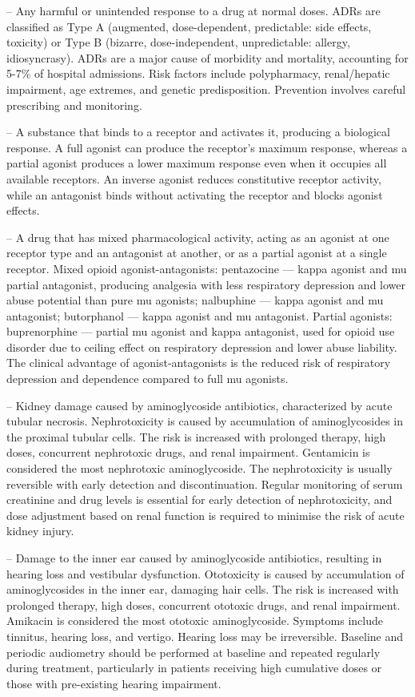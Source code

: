 -- Any harmful or unintended response to a drug at normal doses. ADRs are classified as Type A (augmented, dose-dependent, predictable: side effects, toxicity) or Type B (bizarre, dose-independent, unpredictable: allergy, idiosyncrasy). ADRs are a major cause of morbidity and mortality, accounting for 5-7\% of hospital admissions. Risk factors include polypharmacy, renal/hepatic impairment, age extremes, and genetic predisposition. Prevention involves careful prescribing and monitoring.

-- A substance that binds to a receptor and activates it, producing a biological response. A full agonist can produce the receptor's maximum response, whereas a partial agonist produces a lower maximum response even when it occupies all available receptors. An inverse agonist reduces constitutive receptor activity, while an antagonist binds without activating the receptor and blocks agonist effects.

-- A drug that has mixed pharmacological activity, acting as an agonist at one receptor type and an antagonist at another, or as a partial agonist at a single receptor. Mixed opioid agonist-antagonists: pentazocine — kappa agonist and mu partial antagonist, producing analgesia with less respiratory depression and lower abuse potential than pure mu agonists; nalbuphine — kappa agonist and mu antagonist; butorphanol — kappa agonist and mu antagonist. Partial agonists: buprenorphine — partial mu agonist and kappa antagonist, used for opioid use disorder due to ceiling effect on respiratory depression and lower abuse liability. The clinical advantage of agonist-antagonists is the reduced risk of respiratory depression and dependence compared to full mu agonists.

-- Kidney damage caused by aminoglycoside antibiotics, characterized by acute tubular necrosis. Nephrotoxicity is caused by accumulation of aminoglycosides in the proximal tubular cells. The risk is increased with prolonged therapy, high doses, concurrent nephrotoxic drugs, and renal impairment. Gentamicin is considered the most nephrotoxic aminoglycoside. The nephrotoxicity is usually reversible with early detection and discontinuation. Regular monitoring of serum creatinine and drug levels is essential for early detection of nephrotoxicity, and dose adjustment based on renal function is required to minimise the risk of acute kidney injury.

-- Damage to the inner ear caused by aminoglycoside antibiotics, resulting in hearing loss and vestibular dysfunction. Ototoxicity is caused by accumulation of aminoglycosides in the inner ear, damaging hair cells. The risk is increased with prolonged therapy, high doses, concurrent ototoxic drugs, and renal impairment. Amikacin is considered the most ototoxic aminoglycoside. Symptoms include tinnitus, hearing loss, and vertigo. Hearing loss may be irreversible. Baseline and periodic audiometry should be performed at baseline and repeated regularly during treatment, particularly in patients receiving high cumulative doses or those with pre-existing hearing impairment.

